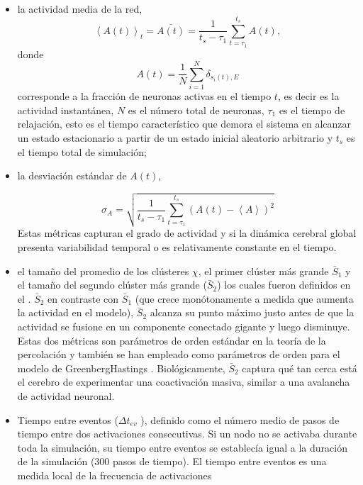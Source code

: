 \begin{itemize}
	\item  la actividad media de la red,
	\begin{equation}\label{eq:58}
		\left\langle A(t)\right\rangle_t  = \bar{A(t)} = \frac{1}{t_s-\tau_1}\sum_{t=\tau_1}^{t_s} A(t),
	\end{equation}
	donde 
	\begin{equation}\label{eq:59}
		A(t) = \frac{1}{N}\sum_{i=1}^{N} \delta_{s_i(t),E}
	\end{equation}
	corresponde a la fracción de neuronas activas en el tiempo $t$, es decir  es la actividad instantánea, $N$ es el número total de neuronas, $\tau_1$ es el tiempo de relajación, esto es el tiempo característico que demora el sistema en alcanzar un estado estacionario a partir de un estado inicial aleatorio arbitrario y $t_s$ es el tiempo total de simulación;
	\item la desviación estándar de $A(t)$,
	
	\begin{equation}
		\sigma_A=\sqrt{\frac{1}{t_s-\tau_1}\sum_{t=\tau_1}^{t_s}\left(A(t)-\left\langle  A\right\rangle \right)^2}
	\end{equation}
	Estas métricas capturan el grado de actividad y si la dinámica cerebral global presenta variabilidad temporal o es relativamente constante en el tiempo.
	\item el tamaño del promedio de los clústeres $\chi$, el primer clúster más grande $\bar{S}_1$ y  el tamaño del segundo clúster más grande ($\bar{S}_2$) los cuales fueron definidos en el . $\bar{S}_2$  en contraste con  $\bar{S}_1$ (que crece monótonamente a medida que aumenta la actividad en el modelo), $\bar{S}_2$ alcanza su punto máximo justo antes de que la actividad se fusione en un componente conectado gigante y luego disminuye. Estas dos métricas son parámetros de orden estándar en la teoría de la percolación \cite{stauffer_scaling_1979} y también se han empleado como parámetros de orden para el modelo de GreenbergHastings \cite{haimovici_brain_2013}. Biológicamente, $\bar{S}_2$  captura qué tan cerca está el cerebro de experimentar una coactivación masiva, similar a una avalancha de actividad neuronal.
	
	\item Tiempo entre eventos ($\Delta t_{ev}$ ), definido como el número medio de pasos de tiempo entre dos activaciones consecutivas. Si un nodo no se activaba durante toda la simulación, su tiempo entre eventos se establecía igual a la duración de la simulación (300 pasos de tiempo). El tiempo entre eventos es una medida local de la frecuencia de activaciones
	
\end{itemize}


